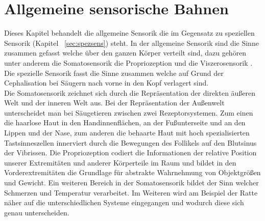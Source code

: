 \documentclass[12pt,a4paper,pdftex]{article}
\begin{document}
\newpage
\section{Allgemeine sensorische Bahnen}
Dieses Kapitel behandelt die allgemeine Sensorik  die im Gegensatz zu speziellen Sensorik (Kapitel~ \ref{sec:spezsens}) steht. In der allgemeine Sensorik sind die Sinne zusammen gefasst welche über den ganzen Körper verteilt sind, dazu gehören unter anderem die Somatosensorik  die Propriozeption  und die Viszerosensorik \cite[Kap. 22]{kandel2013principles}. Die spezielle Sensorik  fasst die Sinne zusammen welche auf Grund der Cephalisation bei Säugern nach vorne in den Kopf verlagert sind.
\\
Die Somatosensorik zeichnet sich durch die Repräsentation der direkten äußeren Welt und der inneren Welt aus. Bei der Repräsentation der Außenwelt unterscheidet man bei Säugetieren zwischen zwei Rezeptorsystemen. Zum einen die haarlose Haut in den Handinnenflächen, an der Fußunterseite und an den Lippen und der Nase, zum anderen die behaarte Haut mit hoch spezialisierten Tastsinneszellen innerviert durch die Bewegungen des Follikels auf den Blutsinus  der Vibrissen.   \cite{paxinos2014rat}
Die Propriozeption codiert die Informationen der relative Position unserer Extremitäten und anderer Körperteile im Raum und bildet in den Vorderextremitäten die Grundlage für abstrakte Wahrnehmung von Objektgrößen und Gewicht. Ein weiteren Bereich in der Somatosensorik bildet der Sinn welcher Schmerzen und Temperatur verarbeitet. \cite{paxinos2014rat}
Im Weiteren wird am Beispiel der Ratte näher auf die unterschiedlichen Systeme eingegangen und wodurch diese sich genau unterscheiden. 
\end{document}
